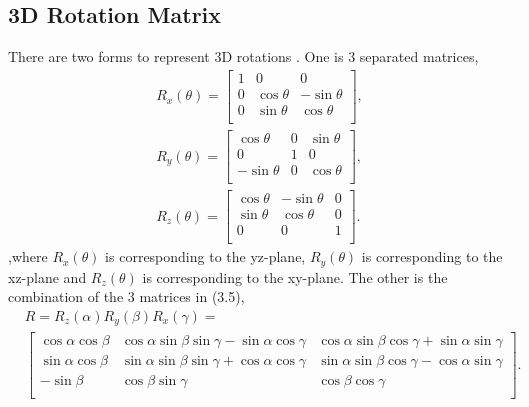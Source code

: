 \subsection{3D Rotation Matrix}
\label{section:3Drotationmatrix}
There are two forms to represent 3D rotations \cite{r9}. One is 3 separated matrices,
\begin{equation}
\begin{aligned}
R_{x}(\theta)=\begin{bmatrix}
1&          0&          0\\
0&\cos\theta & -\sin\theta\\
0&\sin\theta & \cos\theta\\
\end{bmatrix},
\\R_{y}(\theta)=\begin{bmatrix}
  \cos\theta&          0&\sin\theta\\
           0&          1& 0\\
-\sin\theta &          0&\cos\theta\\
\end{bmatrix},
\\R_{z}(\theta)=\begin{bmatrix}
\cos\theta&-\sin\theta&0\\
\sin\theta& \cos\theta&0\\
         0&          0&1\\
\end{bmatrix}.
\end{aligned}
\end{equation}
,where $R_{x}(\theta)$ is corresponding to the yz-plane, $R_{y}(\theta)$ is corresponding to the xz-plane and $R_{z}(\theta)$ is corresponding to the xy-plane. The other is the combination of the 3 matrices in (3.5), 
\begin{equation}
\begin{aligned}
&R=R_{z}(\alpha)R_{y}(\beta)R_{x}(\gamma)=\\
&\begin{bmatrix}
\cos\alpha\cos\beta&\cos\alpha\sin\beta\sin\gamma-\sin\alpha\cos\gamma&\cos\alpha\sin\beta\cos\gamma+\sin\alpha\sin\gamma\\
\sin\alpha\cos\beta&\sin\alpha\sin\beta\sin\gamma+\cos\alpha\cos\gamma&\sin\alpha\sin\beta\cos\gamma-\cos\alpha\sin\gamma\\
         -\sin\beta&                               \cos\beta\sin\gamma&\cos\beta\cos\gamma\\
\end{bmatrix}.
\end{aligned}
\end{equation}
